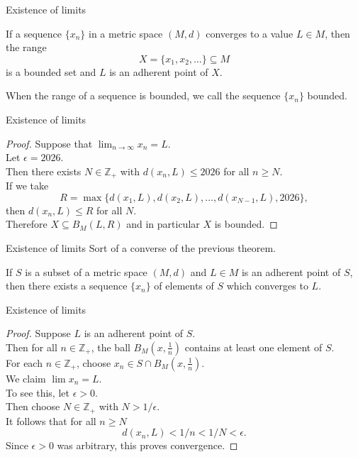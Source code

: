 \documentclass{beamer}
\begin{document}
\begin{frame}{Existence of limits}
\begin{thm}
If a sequence $\{x_n\}$ in a metric space $(M,d)$ converges to a value $L\in M$, then the range
$$X = \{x_1,x_2,\dots\}\subseteq M$$
is a bounded set and $L$ is an adherent point of $X$.
\end{thm}
\pause
When the range of a sequence is bounded, we call the sequence $\{x_n\}$ bounded.
\end{frame}

\begin{frame}{Existence of limits}
\begin{proof}
Suppose that $\lim_{n\rightarrow\infty} x_n = L$.\\
\pause
Let $\epsilon = 2026$.\\
\pause
Then there exists $N\in\mathbb{Z}_+$ with $d(x_n,L)\leq 2026$ for all $n\geq N$.\\
\pause
If we take
$$R = \max\{d(x_1,L),d(x_2,L),\dots, d(x_{N-1},L),2026\},$$
\pause
then $d(x_n,L)\leq R$ for all $N$.\\
\pause
Therefore $X\subseteq B_M(L,R)$ and in particular $X$ is bounded.
\end{proof}
\end{frame}

\begin{frame}{Existence of limits}
Sort of a converse of the previous theorem.
\pause
\begin{thm}
If $S$ is a subset of a metric space $(M,d)$ and $L\in M$ is an adherent point of $S$, then there exists a sequence $\{x_n\}$ of elements of $S$ which converges to $L$.
\end{thm}
\end{frame}

\begin{frame}{Existence of limits}
\begin{proof}
Suppose $L$ is an adherent point of $S$.\\
\pause
Then for all $n\in\mathbb{Z}_+$, the ball $B_M(x,\frac{1}{n})$ contains at least one element of $S$.\\
\pause
For each $n\in\mathbb{Z}_+$, choose $x_n\in S\cap B_M(x,\frac{1}{n})$.\\
\pause
We claim $\lim x_n = L$.\\
\pause
To see this, let $\epsilon > 0$.\\
\pause
Then choose $N\in\mathbb{Z}_+$ with $N>1/\epsilon$.\\
\pause
It follows that for all $n\geq N$
$$d(x_n,L) < 1/n < 1/N < \epsilon.$$
\pause
Since $\epsilon > 0$ was arbitrary, this proves convergence.
\end{proof}
\end{frame}
\end{document}
